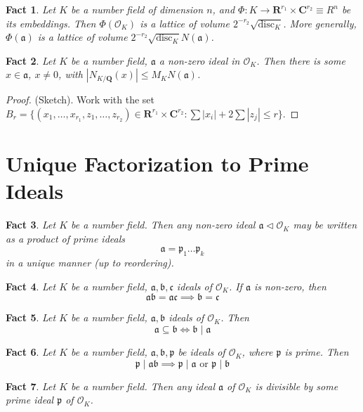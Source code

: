 \documentclass[12pt]{article}
\newtheorem*{fact*}{Fact}
\renewcommand{\a}{\mathfrak{a}}
\newcommand{\abs}[1]{\left\lvert#1\right\rvert}
\renewcommand{\b}{\mathfrak{b}}
\renewcommand{\c}{\mathfrak{c}}
\DeclareMathOperator{\disc}{disc}
\newcommand{\ideal}{\triangleleft}
\newcommand{\p}{\mathfrak{p}}
\newcommand{\C}{\mathbf{C}}
\newcommand{\Q}{\mathbf{Q}}
\newcommand{\R}{\mathbf{R}}
\newcommand{\OO}{\mathcal{O}}
\begin{document}
\begin{fact*}
Let $K$ be a number field of dimension $n$, and $\Phi : K \to \R^{r_1}\times \C^{r_2}\equiv R^n$ be its embeddings. Then $\Phi(\OO_K)$ is a lattice of volume $2^{-r_2}\sqrt{\disc_K}$. 
More generally, $\Phi(\a)$ is a lattice of volume $2^{-r_2}\sqrt{\disc_K}N(\a)$.
\end{fact*}


\begin{fact*}
Let $K$ be a number field, $\a$ a non-zero ideal in $\OO_K$. Then there is some $x\in\a$, $x\neq 0$, with $\abs{N_{K/\Q}(x)} \le M_K N(\a)$.
\end{fact*}


\begin{proof}
(Sketch). Work with the set $B_r = \{(x_1,\dots,x_{r_1},z_1,\dots,z_{r_2})\in\R^{r_1}\times\C^{r_2}:\sum \abs{x_i} + 2\sum\abs{z_j}\le r\}$.
\end{proof}


\newpage
\section{Unique Factorization to Prime Ideals}

\begin{fact*}
Let $K$ be a number field. Then any non-zero ideal $\a \ideal \OO_K$ may be written as a product of prime ideals
\[ \a = \p_1 \dots \p_k\]
in a unique manner (up to reordering).
\end{fact*}


\begin{fact*}
Let $K$ be a number field, $\a,\b,\c$ ideals of $\OO_K$. If $\a$ is non-zero, then \[\a\b=\a\c \implies \b=\c\]
\end{fact*}


\begin{fact*}
Let $K$ be a number field, $\a,\b$ ideals of $\OO_K$. Then 
\[\a \subseteq \b \iff \b \mid \a\]
\end{fact*}

\begin{fact*}
Let $K$ be a number field, $\a,\b,\p$ be ideals of $\OO_K$, where $\p$ is prime. Then 
\[\p \mid \a\b \implies \p \mid \a \text{ or } \p\mid \b\]
\end{fact*}

\begin{fact*}
Let $K$ be a number field. Then any ideal $\a$ of $\OO_K$ is divisible by some prime ideal $\p$ of $\OO_K$.
\end{fact*}
\end{document}
